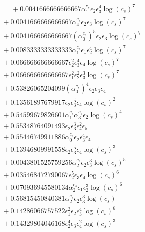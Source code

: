 \documentclass[10pt]{article}
\begin{document}
\begin{align*}
\phantom{F_{s,7}} &\phantom{={}}{}  + 0.0041666666666667 \alpha_{1}^{c_s} \epsilon_{2} \epsilon_{3}^{4} \log{\left(c_{s} \right)}^{7} \\
&{}  + 0.0041666666666667 \alpha_{4}^{c_s} \epsilon_{2} \epsilon_{3} \log{\left(c_{s} \right)}^{7} \\
&{}  + 0.0041666666666667 \left(\alpha_{0}^{c_s}\right)^{5} \epsilon_{2} \epsilon_{3} \log{\left(c_{s} \right)}^{7} \\
&{}  + 0.0083333333333333 \alpha_{1}^{c_s} \epsilon_{1} \epsilon_{2}^{4} \log{\left(c_{s} \right)}^{7} \\
&{}  + 0.066666666666667 \epsilon_{2}^{2} \epsilon_{3}^{4} \epsilon_{4} \log{\left(c_{s} \right)}^{7} \\
&{}  + 0.066666666666667 \epsilon_{1}^{2} \epsilon_{2}^{2} \epsilon_{3}^{3} \log{\left(c_{s} \right)}^{7} \\
&{}  + 0.53826065204099 \left(\alpha_{0}^{c_s}\right)^{4} \epsilon_{2} \epsilon_{3} \epsilon_{4} \\
&{}  + 0.13561897679917 \epsilon_{2} \epsilon_{3}^{5} \epsilon_{4} \log{\left(c_{s} \right)}^{2} \\
&{}  + 0.54599679826601 \alpha_{1}^{c_s} \alpha_{3}^{c_s} \epsilon_{2} \log{\left(c_{s} \right)}^{4} \\
&{}  + 0.55348764091493 \epsilon_{2} \epsilon_{3}^{3} \epsilon_{4}^{2} \epsilon_{5} \\
&{}  + 0.55446749911886 \alpha_{0}^{c_s} \epsilon_{2} \epsilon_{3}^{4} \epsilon_{4} \\
&{}  + 0.13946809991558 \epsilon_{2} \epsilon_{3}^{5} \epsilon_{4} \log{\left(c_{s} \right)}^{3} \\
&{}  + 0.0043801525759256 \alpha_{2}^{c_s} \epsilon_{2} \epsilon_{3}^{3} \log{\left(c_{s} \right)}^{5} \\
&{}  + 0.035468472790067 \epsilon_{2}^{5} \epsilon_{3} \epsilon_{4} \log{\left(c_{s} \right)}^{6} \\
&{}  + 0.070936945580134 \alpha_{2}^{c_s} \epsilon_{1} \epsilon_{2}^{3} \log{\left(c_{s} \right)}^{6} \\
&{}  + 0.56815450840381 \alpha_{2}^{c_s} \epsilon_{2} \epsilon_{3}^{3} \log{\left(c_{s} \right)} \\
&{}  + 0.14286066757522 \epsilon_{1}^{2} \epsilon_{2} \epsilon_{3}^{4} \log{\left(c_{s} \right)}^{6} \\
&{}  + 0.14329804046168 \epsilon_{2}^{4} \epsilon_{3} \epsilon_{4}^{2} \log{\left(c_{s} \right)}^{3} \\

\end{align*}
\end{document}
